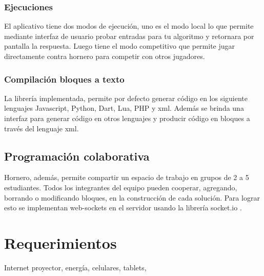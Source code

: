 \documentclass{articleteyet}
\begin{document}
\subsubsection{Ejecuciones}
El aplicativo tiene dos modos de ejecución, uno es el modo local lo que permite mediante interfaz de usuario probar entradas para tu algoritmo y retornara por pantalla la respuesta. Luego tiene el modo competitivo que permite jugar directamente contra hornero para competir con otros jugadores.
    
    
\subsubsection{Compilación bloques a texto}


La librería implementada, permite por defecto generar código en los siguiente lenguajes Javascript, Python, Dart, Lua, PHP y xml. Además se brinda una interfaz para generar código en otros lenguajes y producir código en bloques a través del lenguaje xml.


\subsection{Programación colaborativa}
Hornero, además, permite compartir un espacio de trabajo en grupos de 2 a 5 estudiantes. Todos los integrantes del equipo pueden cooperar, agregando, borrando o modificando bloques, en la construcción de cada solución.
Para lograr esto se implementan web-sockets en el servidor%
 usando la librería socket.io \cite{cadenhead2015socket}.









\section{Requerimientos}
Internet proyector, energía, celulares, tablets,
\end{document}
